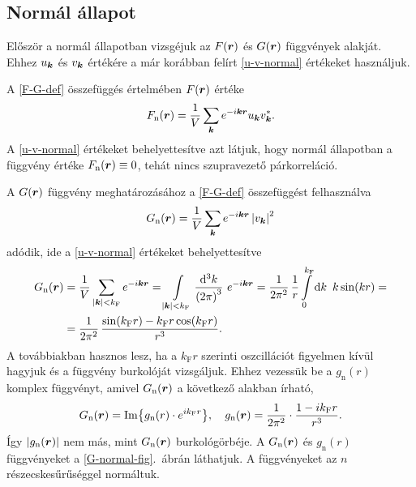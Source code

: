 \documentclass[a4paper,12pt,titlepage]{article}
\newcommand{\KK}{{\vb*{k}}}
\newcommand{\RR}{{\vb*{r}}}
\newcommand{\kF}{{k_\text{F}}}
\begin{document}
\subsection{Normál állapot}

Először a normál állapotban vizsgéjuk az $F(\RR)$ és $G(\RR)$ függvények alakját.  Ehhez $u_\KK$ és $v_\KK$ értékére a már korábban felírt \eqref{u-v-normal} értékeket használjuk.

A \eqref{F-G-def} összefüggés értelmében $F(\RR)$ értéke
\begin{equation}
	F_\text{n}(\RR) = \frac{1}{V} \sum\limits_\KK e^{-i \KK \RR} u_\KK v_\KK^*.
\end{equation}
A \eqref{u-v-normal} értékeket behelyettesítve azt látjuk, hogy normál állapotban a függvény értéke $F_\text{n}(\RR) \equiv 0$, tehát nincs szupravezető párkorreláció.


A $G(\RR)$ függvény meghatározásához a \eqref{F-G-def} összefüggést felhasználva
\begin{equation}
	G_\text{n}(\RR) = \frac{1}{V} \sum\limits_\KK e^{-i \KK \RR} \left| v_\KK \right|^2
\end{equation}
adódik, ide a \eqref{u-v-normal} értékeket behelyettesítve
\begin{equation}
\begin{split}
	G_\text{n}(\RR) & = \frac{1}{V} \sum\limits_{\left| \KK \right| < \kF} e^{-i \KK \RR} = \int\limits_{\left| \KK \right| < \kF} \frac{\dd[3]k}{\left( 2 \pi \right)^3} ~ e^{-i \KK \RR} = \frac{1}{2 \pi^2} \, \frac{1}{r} \int\limits_0^{\kF} \dd{k} ~ k \sin(k r) = \\
	& = \frac{1}{2 \pi^2} \, \frac{\sin(\kF r) - \kF r \cos(\kF r)}{r^3}.
\end{split}
\end{equation}
A továbbiakban hasznos lesz, ha a $\kF r$ szerinti oszcillációt figyelmen kívül hagyjuk és a függvény burkolóját vizsgáljuk.  Ehhez vezessük be a $g_\text{n}(r)$ komplex függvényt, amivel $G_\text{n}(\RR)$ a következő alakban írható,
\begin{equation}
	G_\text{n}(\RR) = \Im{g_\text{n}(r) \cdot e^{i \kF r}}, ~~~ g_\text{n}(\RR) = \frac{1}{2 \pi^2} \cdot \frac{1 - i \kF r}{r^3}.
\end{equation}
Így $\left| g_\text{n}(\RR) \right|$ nem más, mint $G_\text{n}(\RR)$ burkológörbéje.  A $G_\text{n}(\RR)$ és $g_\text{n}(r)$ függvényeket a \ref{G-normal-fig}.\ ábrán láthatjuk.  A függvényeket az $n$ részecskesűrűséggel normáltuk.
\end{document}
